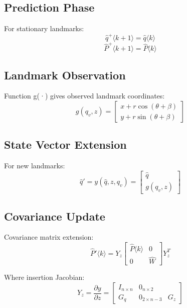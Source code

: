 \documentclass[openany]{book}
\theoremstyle{definition}
\theoremstyle{remark}
\begin{document}
\subsection{Prediction Phase}
For stationary landmarks:
\begin{equation}
   \hat{q}^+\langle k + 1\rangle = \hat{q}\langle k\rangle
\end{equation}
\begin{equation}
   \hat{P}^+\langle k + 1\rangle = \hat{P}\langle k\rangle
\end{equation}

\subsection{Landmark Observation}
Function g(·) gives observed landmark coordinates:
\begin{equation}
   g(q_v, z) = \begin{bmatrix}
       x + r\cos(\theta + \beta) \\
       y + r\sin(\theta + \beta)
   \end{bmatrix}
\end{equation}

\subsection{State Vector Extension}
For new landmarks:
\begin{equation}
   \hat{q}' = y(\hat{q}, z, q_v) = \begin{bmatrix}
       \hat{q} \\
       g(q_v, z)
   \end{bmatrix}
\end{equation}

\subsection{Covariance Update}
Covariance matrix extension:
\begin{equation}
   \hat{P}'\langle k\rangle = Y_z \begin{bmatrix}
       \hat{P}\langle k\rangle & 0 \\
       0 & \hat{W}
   \end{bmatrix} Y_z^T
\end{equation}

Where insertion Jacobian:
\begin{equation}
   Y_z = \frac{\partial y}{\partial z} = \begin{bmatrix}
       I_{n\times n} & 0_{n\times 2} \\
       G_q & 0_{2\times n-3} & G_z
   \end{bmatrix}
\end{equation}
\end{document}
